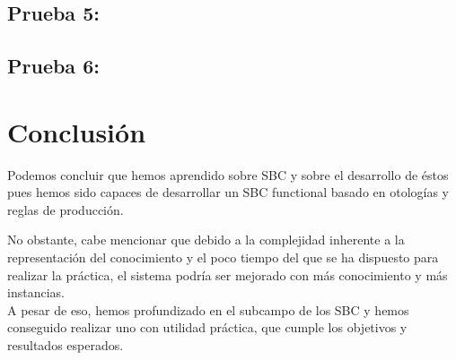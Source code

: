 \documentclass[12]{article}
\begin{document}
\subsection{Prueba 5: }
\subsection{Prueba 6: }
\section{Conclusión}
Podemos concluir que hemos aprendido sobre SBC y sobre el desarrollo de éstos pues hemos sido capaces de desarrollar un SBC functional basado en otologías y reglas de producción.
\medksip

No obstante, cabe mencionar que debido a la complejidad inherente a la representación del conocimiento y el poco tiempo del que se ha dispuesto para realizar la práctica, el sistema podría ser mejorado con más conocimiento y más instancias. 
\\

A pesar de eso, hemos profundizado en el subcampo de los SBC y hemos conseguido realizar uno con utilidad práctica, que cumple los objetivos y resultados esperados.
\end{document}

